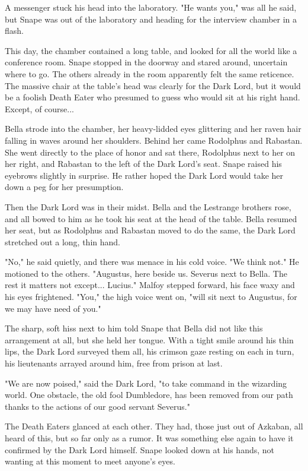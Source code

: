 \documentclass[a4paper,11pt]{article}
\begin{document}
A messenger stuck his head into the laboratory. "He wants you," was all he said, but Snape was out of the laboratory and heading for the interview chamber in a flash.

This day, the chamber contained a long table, and looked for all the world like a conference room. Snape stopped in the doorway and stared around, uncertain where to go. The others already in the room apparently felt the same reticence. The massive chair at the table's head was clearly for the Dark Lord, but it would be a foolish Death Eater who presumed to guess who would sit at his right hand. Except, of course...

Bella strode into the chamber, her heavy-lidded eyes glittering and her raven hair falling in waves around her shoulders. Behind her came Rodolphus and Rabastan. She went directly to the place of honor and sat there, Rodolphus next to her on her right, and Rabastan to the left of the Dark Lord's seat. Snape raised his eyebrows slightly in surprise. He rather hoped the Dark Lord would take her down a peg for her presumption.

Then the Dark Lord was in their midst. Bella and the Lestrange brothers rose, and all bowed to him as he took his seat at the head of the table. Bella resumed her seat, but as Rodolphus and Rabastan moved to do the same, the Dark Lord stretched out a long, thin hand.

"No," he said quietly, and there was menace in his cold voice. "We think not." He motioned to the others. "Augustus, here beside us. Severus next to Bella. The rest it matters not except... Lucius." Malfoy stepped forward, his face waxy and his eyes frightened. "You," the high voice went on, "will sit next to Augustus, for we may have need of you."

The sharp, soft hiss next to him told Snape that Bella did not like this arrangement at all, but she held her tongue. With a tight smile around his thin lips, the Dark Lord surveyed them all, his crimson gaze resting on each in turn, his lieutenants arrayed around him, free from prison at last.

"We are now poised," said the Dark Lord, "to take command in the wizarding world. One obstacle, the old fool Dumbledore, has been removed from our path thanks to the actions of our good servant Severus."

The Death Eaters glanced at each other. They had, those just out of Azkaban, all heard of this, but so far only as a rumor. It was something else again to have it confirmed by the Dark Lord himself. Snape looked down at his hands, not wanting at this moment to meet anyone's eyes.
\end{document}
